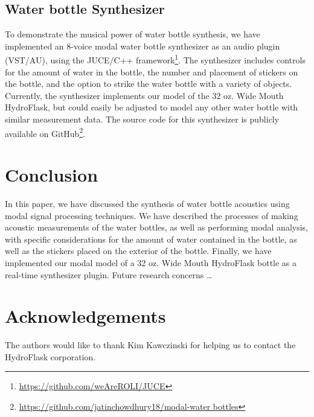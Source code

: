 \documentclass[twoside,a4paper]{article}
\begin{document}
\subsection{Water bottle Synthesizer} \label{sec:synth}
%
To demonstrate the musical power of water bottle synthesis, we have
implemented an 8-voice modal water bottle synthesizer as an audio
plugin (VST/AU), using the JUCE/C++ framework\footnote{\url{https://github.com/weAreROLI/JUCE}}.
The synthesizer includes controls for the amount of water in the bottle,
the number and placement of stickers on the bottle, and the option to
strike the water bottle with a variety of objects. Currently, the synthesizer
implements our model of the 32 oz. Wide Mouth HydroFlask, but could easily
be adjusted to model any other water bottle with similar measurement data.
The source code for this synthesizer is publicly available on
GitHub\footnote{\url{https://github.com/jatinchowdhury18/modal-water bottles}}.
%
\section{Conclusion} \label{sec:conclusion}
%
In this paper, we have discussed the synthesis of water bottle acoustics
using modal signal processing techniques. We have described the processes
of making acoustic measurements of the water bottles, as well as performing
modal analysis, with specific considerations for the amount of water
contained in the bottle, as well as the stickers placed on the exterior
of the bottle. Finally, we have implemented our modal model of a 32 oz.
Wide Mouth HydroFlask bottle as a real-time synthesizer plugin.
\newline\newline
Future research concerns \dots

\section{Acknowledgements}
%
The authors would like to thank Kim Kawczinski for helping us to contact
the HydroFlask corporation.

\nocite{*}


\end{document}
